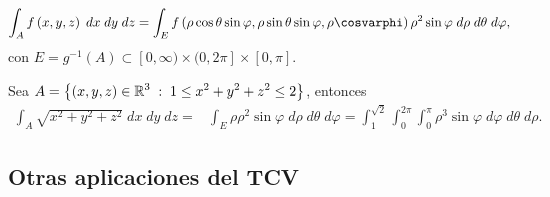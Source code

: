 \[ \int _{A}f\left(x,y,z\right) \; dx \; dy \; dz = \int _{E}f\left(\rho\cos\theta \sin\varphi, \rho \sin\theta \sin\varphi, \rho \cosvarphi\right) \rho^{2}\sin\varphi \; d\rho \; d\theta \; d\varphi,\]
con $\displaystyle E =g^{-1}\left(A\right)\subset [0,\infty) \times (0,2\pi] \times \left[0,\pi \right]  $. 
\begin{eg}
	Sea $\displaystyle A = \left\{ \left(x,y,z\right)\in \mathbb{R}^{3} \; : \; 1 \leq x^{2}+y^{2}+z^{2}\leq 2\right\}  $, entonces
	\[
	\begin{split}
		\int _{A}\sqrt{x^{2}+y^{2}+z^{2}} \; dx \; dy \; dz = & \int _{E}\rho \rho^{2}\sin\varphi \; d\rho \; d\theta \; d\varphi = \int^{\sqrt{2}}_{1} \int^{2\pi }_{0} \int^{\pi }_{0} \rho^{3}\sin\varphi \; d\varphi \; d\theta  \; d\rho .
	\end{split}
	\]
	
\end{eg}
\subsection{Otras aplicaciones del TCV}
  

